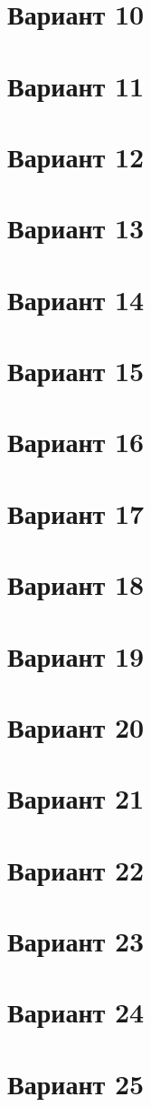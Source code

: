 \documentclass[12pt]{article}
\begin{document}
\section{Вариант 10}

\section{Вариант 11}

\section{Вариант 12}

\section{Вариант 13}

\section{Вариант 14}

\section{Вариант 15}

\section{Вариант 16}

\section{Вариант 17}

\section{Вариант 18}

\section{Вариант 19}

\section{Вариант 20}

\section{Вариант 21}

\section{Вариант 22}

\section{Вариант 23}

\section{Вариант 24}

\section{Вариант 25}
\end{document}
